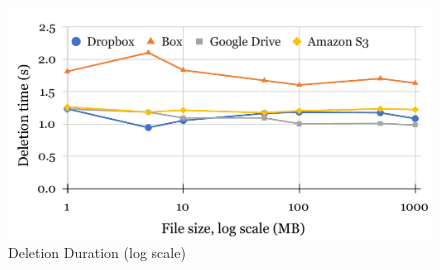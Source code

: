 \begin{figure} [!h]
    \centering
    \includegraphics[scale=0.6]{images/deletion_log_chart}
    \caption{\label{fig:deletion_log_duration}Deletion Duration (log scale)}
\end{figure}
